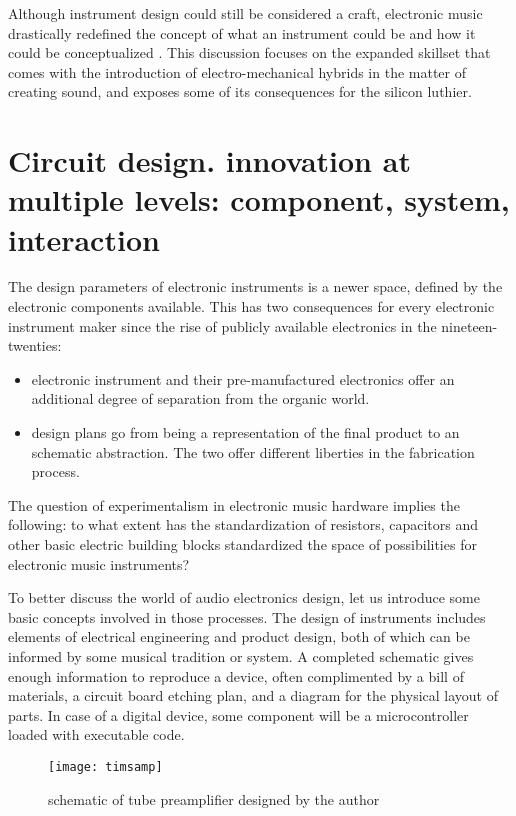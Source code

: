 	Although instrument design could still be considered a craft, electronic music drastically redefined the concept of what an instrument could be and how it could be conceptualized \citep{pinch2002}. This discussion focuses on the expanded skillset that comes with the introduction of electro-mechanical hybrids in the matter of creating sound, and exposes some of its consequences for the silicon luthier. 

\section{Circuit design. innovation at multiple levels: component, system, interaction}

The design parameters of electronic instruments is a newer space, defined by the electronic components available. This has two consequences for every electronic instrument maker since the rise of publicly available electronics in the nineteen-twenties:

\begin{itemize}
	\item electronic instrument and their pre-manufactured electronics offer an additional degree of separation from the organic world. 
	\item design plans go from being a representation of the final product to an schematic abstraction. The two offer different liberties in the fabrication process.
\end{itemize}
	
The question of experimentalism in electronic music hardware implies the following: to what extent has the standardization of resistors, capacitors and other basic electric building blocks standardized the space of possibilities for electronic music instruments?

To better discuss the world of audio electronics design, let us introduce some basic concepts involved in those processes. The design of instruments includes elements of electrical engineering and product design, both of which can be informed by some musical tradition or system. A completed schematic gives enough information to reproduce a device, often complimented by a bill of materials, a circuit board etching plan, and a diagram for the physical layout of parts. In case of a digital device, some component will be a microcontroller loaded with executable code. 

\begin{figure}[h!]
  \caption{schematic of tube preamplifier designed by the author}
  \centering
    \texttt{[image: timsamp]}
\end{figure}


